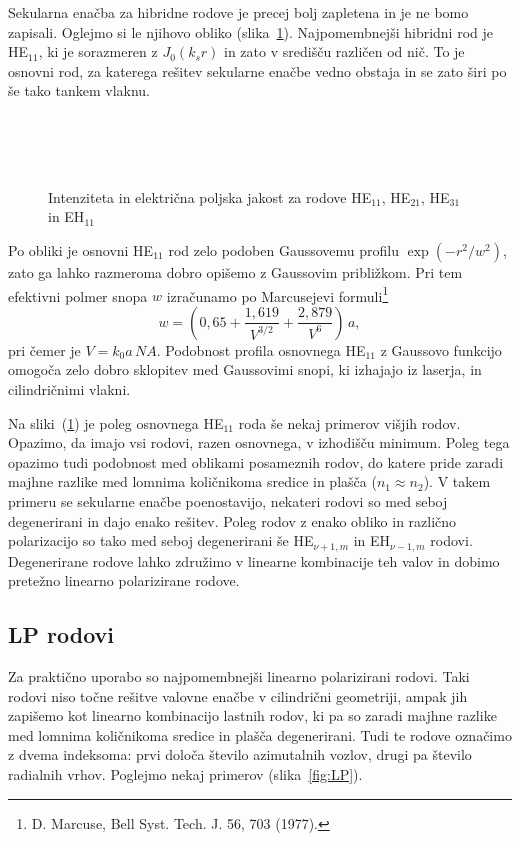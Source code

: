 Sekularna enačba za hibridne rodove je precej bolj zapletena in je ne bomo zapisali. 
Oglejmo si le njihovo obliko (slika~\ref{fig:HE11}). Najpomembnejši hibridni rod je HE$_{11}$, 
ki je sorazmeren z $J_0(k_sr)$ in zato v središču različen od nič. 
To je osnovni rod, za katerega rešitev sekularne enačbe vedno obstaja in se
zato širi po še tako tankem vlaknu. 
\begin{figure}[h]
\centering
\def\svgwidth{85truemm} 
\\
\def\svgwidth{85truemm} 
 \\
\def\svgwidth{85truemm} 
 \\
\def\svgwidth{85truemm} 

\caption{Intenziteta in električna poljska jakost za rodove
HE$_{11}$, HE$_{21}$, HE$_{31}$ in EH$_{11}$}
\label{fig:HE11}
\end{figure}

Po obliki je osnovni HE$_{11}$ rod zelo podoben Gaussovemu profilu $\exp(-r^2/w^2)$,
zato ga lahko razmeroma dobro opišemo z Gaussovim približkom. 
Pri tem efektivni polmer snopa
$w$ izračunamo po Marcusejevi
 formuli\footnote{D. Marcuse, Bell Syst. Tech. J. 56, 703 (1977).}
\begin{equation} 
w = (0,65 + \frac{1,619}{V^{3/2}}+\frac{2,879}{V^{6}})\,a,
\label{Marcuse}
\end{equation}
pri čemer je $V = k_0 a\,NA $. Podobnost profila osnovnega
HE$_{11}$ z Gaussovo funkcijo omogoča zelo dobro sklopitev med Gaussovimi
snopi, ki izhajajo iz laserja, in cilindričnimi vlakni.

Na sliki~(\ref{fig:HE11}) je poleg osnovnega HE$_{11}$ roda še nekaj primerov višjih rodov. Opazimo, 
da imajo vsi rodovi, razen osnovnega, v izhodišču minimum. Poleg tega opazimo tudi podobnost med 
oblikami posameznih rodov, do katere pride zaradi majhne razlike med lomnima količnikoma sredice in plašča
($n_1 \approx n_2$). V takem primeru se sekularne enačbe poenostavijo, nekateri rodovi so 
med seboj degenerirani in dajo enako rešitev. Poleg rodov z enako obliko in različno polarizacijo so tako 
med seboj degenerirani še HE$_{\nu+1,m}$ in EH$_{\nu-1,m}$ rodovi. Degenerirane 
rodove lahko združimo v linearne kombinacije teh valov in dobimo pretežno linearno polarizirane 
rodove. 

\subsection*{LP rodovi}
Za praktično uporabo so najpomembnejši linearno polarizirani rodovi. Taki rodovi niso
točne rešitve valovne enačbe v cilindrični geometriji, ampak jih zapišemo kot linearno 
kombinacijo lastnih rodov, ki pa so zaradi majhne razlike med lomnima količnikoma sredice
in plašča degenerirani. Tudi te rodove označimo z dvema indeksoma: prvi določa število azimutalnih
vozlov, drugi pa število radialnih vrhov. Poglejmo nekaj primerov (slika~\ref{fig:LP}).

